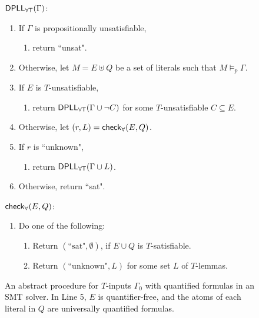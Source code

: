 \documentclass[oribibl]{llncs}
\begin{document}
\begin{figure}[t]
\begin{framed}
\begin{internallinenumbers}
$\small\mathsf{DPLL_{\forall T}}( \Gamma )$:
\begin{enumerate}
\item[\ ] If $\Gamma$ is propositionally unsatisfiable,
\begin{enumerate}
\item[\ ] return ``unsat".
\end{enumerate}
\item[\ ] Otherwise, let $M = E \uplus Q$ be a set of literals such that $M \models_p \Gamma$.
\item[\ ] If $E$ is $T$-unsatisfiable,
\begin{enumerate}
\item[\ ] return $\small\mathsf{DPLL_{\forall T}}( \Gamma \cup \neg C )$ for some $T$-unsatisfiable $C \subseteq E$.
\end{enumerate}
\item[\ ] Otherwise, let $( r, L ) = \small\mathsf{check}_\forall( E, Q )$.
\item[\ ] If $r$ is ``unknown",
\begin{enumerate}
\item[\ ] return $\small\mathsf{DPLL_{\forall T}}( \Gamma \cup L )$.
\end{enumerate}
\item[\ ] Otherwise, return ``sat".
\end{enumerate}
$\small\mathsf{check}_\forall( E, Q )$:
\begin{enumerate}
\item[\ ] Do one of the following:
\begin{enumerate}
\item[\ ] Return $( \text{``sat"}, \emptyset )$, if $E \cup Q$ is $T$-satisfiable.
\item[\ ] Return $( \text{``unknown"}, L )$ for some set $L$ of $T$-lemmas.
\end{enumerate}
\end{enumerate}
\end{internallinenumbers}
\end{framed}
\vspace{-2ex}
\caption{An abstract procedure for $T$-inputs $\Gamma_0$ with quantified formulas in an SMT solver.
In Line 5, $E$ is quantifier-free, and the atoms of each literal in $Q$ are universally quantified formulas.
\label{fig:smtq}}
\end{figure}
\end{document}
